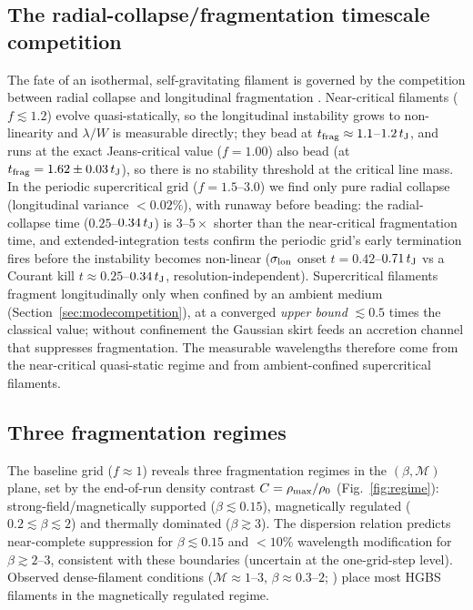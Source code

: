 \documentclass[usenatbib,twoside,twocolumn]{mnras}
\begin{document}
\subsection{The radial-collapse/fragmentation timescale competition}
\label{sec:regimes}

The fate of an isothermal, self-gravitating filament is governed by the competition between radial collapse and longitudinal fragmentation \citep{Inutsuka1997,Pon2012}. Near-critical filaments ($f\lesssim1.2$) evolve quasi-statically, so the longitudinal instability grows to non-linearity and $\lambda/W$ is measurable directly; they bead at $t_{\rm frag}\approx1.1$--$1.2\,t_{\rm J}$, and runs at the exact Jeans-critical value ($f=1.00$) also bead (at $t_{\rm frag}=1.62\pm0.03\,t_{\rm J}$), so there is no stability threshold at the critical line mass. In the periodic supercritical grid ($f=1.5$--$3.0$) we find only pure radial collapse (longitudinal variance $<0.02\%$), with runaway before beading: the radial-collapse time ($0.25$--$0.34\,t_{\rm J}$) is $3$--$5\times$ shorter than the near-critical fragmentation time, and extended-integration tests confirm the periodic grid's early termination fires before the instability becomes non-linear ($\sigma_{\rm lon}$ onset $t=0.42$--$0.71\,t_{\rm J}$ vs a Courant kill $t\approx0.25$--$0.34\,t_{\rm J}$, resolution-independent). Supercritical filaments fragment longitudinally only when confined by an ambient medium (Section~\ref{sec:modecompetition}), at a converged \emph{upper bound} $\lesssim0.5$ times the classical value; without confinement the Gaussian skirt feeds an accretion channel that suppresses fragmentation. The measurable wavelengths therefore come from the near-critical quasi-static regime and from ambient-confined supercritical filaments.

\subsection{Three fragmentation regimes}

The baseline grid ($f\approx1$) reveals three fragmentation regimes in the $(\beta,\mathcal{M})$ plane, set by the end-of-run density contrast $C=\rho_{\rm max}/\rho_0$ (Fig.~\ref{fig:regime}): strong-field/magnetically supported ($\beta\lesssim0.15$), magnetically regulated ($0.2\lesssim\beta\lesssim2$) and thermally dominated ($\beta\gtrsim3$). The dispersion relation \citep{Nakamura1993} predicts near-complete suppression for $\beta\lesssim0.15$ and $<10\%$ wavelength modification for $\beta\gtrsim2$--$3$, consistent with these boundaries (uncertain at the one-grid-step level). Observed dense-filament conditions ($\mathcal{M}\approx1$--$3$, $\beta\approx0.3$--$2$; \citealt{Arzoumanian2019,Planck2016,Pattle2018}) place most HGBS filaments in the magnetically regulated regime.
\end{document}
